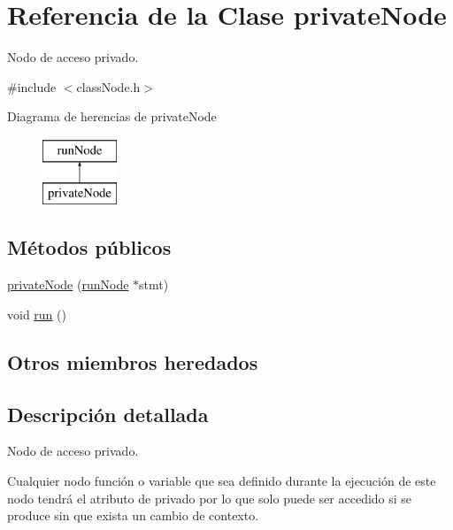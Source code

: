 \hypertarget{classprivateNode}{\section{Referencia de la Clase private\-Node}
\label{classprivateNode}
}


Nodo de acceso privado.  




{\ttfamily \#include $<$class\-Node.\-h$>$}

Diagrama de herencias de private\-Node\begin{figure}[H]
\begin{center}
\leavevmode
\includegraphics[height=2.000000cm]{classprivateNode}
\end{center}
\end{figure}
\subsection*{Métodos públicos}
\begin{DoxyCompactItemize}
\item 
\hyperlink{classprivateNode_a1e8a700d774e651e2acc0156a5a99230}{private\-Node} (\hyperlink{classrunNode}{run\-Node} $\ast$stmt)
\item 
void \hyperlink{classprivateNode_a9e3c651356ee19cec14a05e76bd46337}{run} ()
\end{DoxyCompactItemize}
\subsection*{Otros miembros heredados}


\subsection{Descripción detallada}
Nodo de acceso privado. 

Cualquier nodo función o variable que sea definido durante la ejecución de este nodo tendrá el atributo de privado por lo que solo puede ser accedido si se produce sin que exista un cambio de contexto. 

